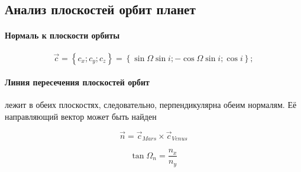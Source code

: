 \subsection{Анализ плоскостей орбит планет}

\paragraph{Нормаль к плоскости орбиты}

$$\vec{c} = \left\{ c_x; c_y; c_z \right\} = \left\{ \sin{\Omega}\sin{i}; -\cos{\Omega}\sin{i}; \cos{i} \right\};$$

\paragraph{Линия пересечения плоскостей орбит} лежит в обеих плоскостях, следовательно, перпендикулярна обеим нормалям. Её направляющий вектор может быть найден

$$\vec{n} = \vec{c}_{Mars} \times \vec{c}_{Venus}$$

$$\tan{\Omega_n} = \frac{n_x}{n_y}$$